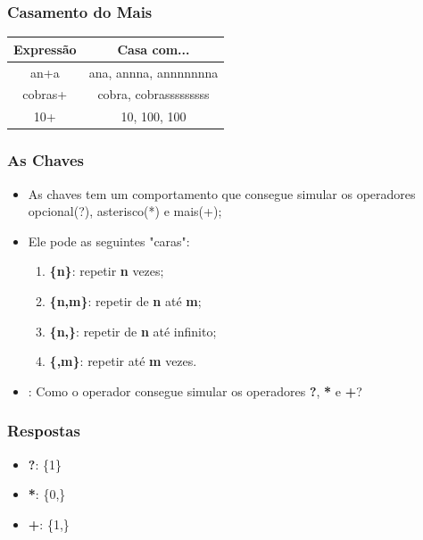 \begin{frame}
	\frametitle{Casamento do Mais}
	\begin{center}
	\begin{tabular}{c|c}
		\textbf{Expressão} & \textbf{Casa com...} \\ \hline
		an+a		& ana, annna, annnnnnna \\ \hline
		cobras+		& cobra, cobrasssssssss \\ \hline
		10+		& 10, 100, 100		\\ \hline
	\end{tabular}
	\end{center}
\end{frame}


\begin{frame}

	\frametitle{As Chaves}
	\begin{itemize}
		\item As chaves tem um comportamento que consegue simular os operadores opcional(?), asterisco(*) e mais(+);
		\item Ele pode as seguintes "caras":
		\begin{enumerate}
			\item \textbf{\{n\}}: repetir \textbf{n} vezes;
			\item \textbf{\{n,m\}}: repetir de \textbf{n} até \textbf{m};
			\item \textbf{\{n,\}}: repetir de \textbf{n} até infinito;
			\item \textbf{\{,m\}}: repetir até \textbf{m} vezes.
		\end{enumerate}
		\item {}: Como o operador consegue simular os operadores \textbf{?}, \textbf{*} e \textbf{+}?
	\end{itemize}
\end{frame}

\begin{frame}
	\frametitle{Respostas}
	\begin{itemize}
		\item \textbf{?}: \{1\}
		\item \textbf{*}: \{0,\}
		\item \textbf{+}: \{1,\}
	\end{itemize}
\end{frame}

